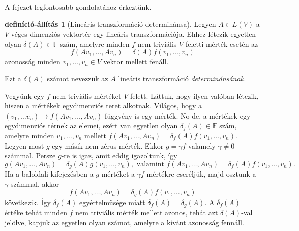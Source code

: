 \documentclass[a4paper, showtrims]{memoir}
\makeatletter
\renewenvironment{proof}[1][\proofname]
    {\par\pushQED{\qed}%
    \normalfont \topsep6\p@\@plus6\p@\relax
    \trivlist
    \item[\hskip\labelsep
        \itshape
    #1\@addpunct{:}]\ignorespaces}
    {\popQED\endtrivlist\@endpefalse}
\theoremstyle{plain}
\theoremstyle{remark}
\theoremstyle{definition}
\newtheorem{defprop}[proposition]{definíció-állítás}
\makeatother
\begin{document}
A fejezet legfontosabb gondolatához érkeztünk.
\begin{defprop}[Lineáris transzformáció determinánsa]
	Legyen $A\in L\left( V \right)$ a $V$ véges dimenziós vektortér egy lineáris transzformációja.
	Ehhez létezik egyetlen olyan $\delta\left( A \right)\in\mathbb{F}$ szám,
	amelyre minden $f$ nem triviális $V$ feletti mérték esetén az
	\[
		f\left( Av_1,\ldots,Av_n \right)
		=
		\delta\left( A \right)
		f\left( v_1,\ldots,v_n \right)
	\]
	azonosság minden $v_1,\ldots,v_n\in V$ vektor mellett fenáll.

	Ezt a $\delta\left( A \right)$ számot nevezzük az $A$ lineáris transzformáció \emph{determinánsának.}
\end{defprop}
\begin{proof}
	Vegyünk egy $f$ nem triviális mértéket $V$ felett.
	Láttuk, hogy ilyen valóban létezik, hiszen a mértékek egydimenziós teret alkotnak.
	Világos, hogy a $\left( v_1,\ldots v_{n}\right) \mapsto f\left( Av_{1},\ldots ,Av_{n}\right) $
	függvény is egy mérték.
	No de, a mértékek egy egydimenziós térnek az elemei,
	ezért van egyetlen olyan $\delta _{f}\left( A\right)\in\mathbb{F} $ szám,
	amelyre minden
	$
		v_{1},\ldots ,v_{n}
	$
	mellett
	$
		f\left( Av_{1},\ldots,Av_{n}\right)
		=
		\delta _{f}\left( A\right) f\left( v_{1},\ldots,v_{n}\right)
	$.
	Legyen most $g$ egy másik nem zérus mérték.
	Ekkor
	$g=\gamma f$ valamely $\gamma\neq 0$ számmal.
	Persze $g$-re is igaz, amit eddig igazoltunk,
	így
	\begin{displaymath}
		g\left( Av_{1},\ldots ,Av_{n}\right)
		=
		\delta_{g}\left( A\right) g\left( v_{1},\ldots ,v_{n}\right),
		\text{ valamint }
		f\left( Av_{1},\ldots,Av_{n}\right)
		=
		\delta _{f}\left( A\right) f\left( v_{1},\ldots,v_{n}\right).
	\end{displaymath}
	Ha a baloldali kifejezésben a $g$ mértéket a $\gamma f$ mértékre cseréljük,
	majd osztunk a $\gamma$ számmal,
	akkor
	\[
		f\left(Av_{1},\ldots ,Av_{n}\right)
		=
		\delta _{g}\left( A\right) f\left(v_{1},\ldots ,v_{n}\right)
	\]
	következik.
	Így $\delta _{f}\left( A\right) $ egyértelműsége miatt
	$
		\delta _{f}\left( A\right) =\delta _{g}\left( A\right).
	$
	A $\delta_f\left( A \right)$ értéke tehát minden $f$ nem triviális mérték mellett azonos,
	tehát azt $\delta(A)$-val jelölve, kapjuk az egyetlen olyan számot,
	amelyre a kívánt azonosság fennáll.
\end{proof}
\end{document}
